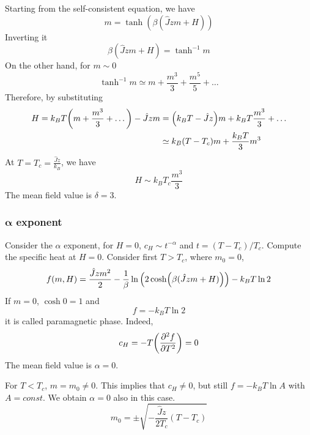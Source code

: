 \documentclass[../../Main/Main.tex]{subfiles}
\begin{document}
Starting from the self-consistent equation, we have
\begin{equation}
  m = \tanh (\beta (\hat{J}zm+H ))
  \label{eq:12_1}
\end{equation}
Inverting it
\begin{equation*}
  \beta (\hat{J}zm+H ) = \tanh^{-1} m
\end{equation*}
On the other hand, for \( m \sim 0 \)
\begin{equation*}
  \tanh^{-1} m \simeq m + \frac{m^3}{3} + \frac{m^5}{5} + \dots
\end{equation*}
Therefore, by substituting
\begin{equation*}
\begin{split}
  H  = k_B T \qty(m+ \frac{m^3}{3} + \dots) - \hat{J} z m
    &= \qty(k_B T - \hat{J}z) m + k_B T \frac{m^3}{3} + \dots \\
    & \simeq k_B (T-T_c)m + \frac{k_B T}{3}m^3
\end{split}
\end{equation*}
At \( T=T_c= \frac{\hat{J}z }{k_B} \), we have
\begin{equation}
  H \sim k_B T_c \frac{m^3}{3}
\end{equation}
The mean field value is \( \delta =3 \).


\subsubsection{\( \pmb{\alpha}  \) exponent}
Consider the \( \alpha  \) exponent, for  \( H=0 \), \( c_H \sim t^{-\alpha } \) and \( t = (T-T_c)/T_c \).
Compute the specific heat at \( H=0 \).
Consider first \( T>T_c \), where \( m_0 =0 \),
\begin{equation*}
  f(m,H) = \frac{\hat{J}zm^2 }{2} - \frac{1}{\beta } \ln{\qty(2\cosh(\beta (\hat{J}zm+H ))) }
  - k_B T \ln 2
\end{equation*}
If \( m=0 \), \( \cosh 0 =1 \) and
\begin{equation*}
  f = -k_B T \ln{2}
\end{equation*}
it is called paramagnetic phase. Indeed,
\begin{equation}
  c_H = - T \qty(\pdv[2]{f}{T} ) = 0
\end{equation}
The mean field value is \( \alpha =0 \).
\begin{remark}
For \( T<T_c \), \( m=m_0 \neq 0 \). This implies that \( c_H \neq 0 \), but still \( f=-k_BT \ln{A}  \) with \( A= const \). We obtain \( \alpha =0 \) also in this case.
\begin{equation*}
  m_0 = \pm \sqrt{- \frac{\hat{J} z}{2T_c}(T-T_c)}
\end{equation*}
\end{remark}
\end{document}

